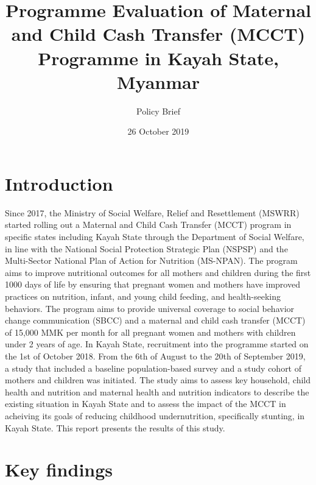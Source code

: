 \documentclass[12pt,a4paper]{article}
\title{Programme Evaluation of Maternal and Child Cash Transfer (MCCT) Programme in Kayah State, Myanmar}
\subtitle{Policy Brief}
\author{}
\date{26 October 2019}
\begin{document}
\maketitle

{
\hypersetup{linkcolor=black}
\setcounter{tocdepth}{4}
\tableofcontents
}
\newpage

\hypertarget{intro}{%
\section{Introduction}\label{intro}}

Since 2017, the Ministry of Social Welfare, Relief and Resettlement (MSWRR) started rolling out a Maternal and Child Cash Transfer (MCCT) program in specific states including Kayah State through the Department of Social Welfare, in line with the National Social Protection Strategic Plan (NSPSP) and the Multi-Sector National Plan of Action for Nutrition (MS-NPAN). The program aims to improve nutritional outcomes for all mothers and children during the first 1000 days of life by ensuring that pregnant women and mothers have improved practices on nutrition, infant, and young child feeding, and health-seeking behaviors. The program aims to provide universal coverage to social behavior change communication (SBCC) and a maternal and child cash transfer (MCCT) of 15,000 MMK per month for all pregnant women and mothers with children under 2 years of age. In Kayah State, recruitment into the programme started on the 1st of October 2018. From the 6th of August to the 20th of September 2019, a study that included a baseline population-based survey and a study cohort of mothers and children was initiated. The study aims to assess key household, child health and nutrition and maternal health and nutrition indicators to describe the existing situation in Kayah State and to assess the impact of the MCCT in acheiving its goals of reducing childhood undernutrition, specifically stunting, in Kayah State. This report presents the results of this study.

\hypertarget{findings}{%
\section{Key findings}\label{findings}}
\end{document}
